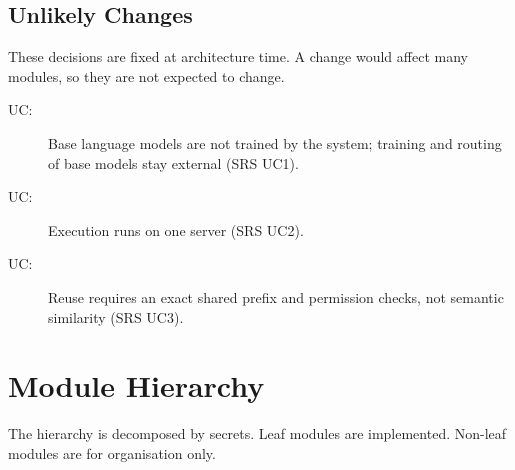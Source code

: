 \documentclass[12pt, titlepage]{article}
\newcounter{ucnum}
\newcommand{\uctheucnum}{UC\theucnum}
\begin{document}
\subsection{Unlikely Changes} \label{SecUchange}

These decisions are fixed at architecture time. A change would affect many
modules, so they are not expected to change.

\begin{description}
\item[ \uctheucnum \label{ucTraining}:] Base language
  models are not trained by the system; training and routing of base models
  stay external (SRS UC1).
\item[ \uctheucnum \label{ucSingle}:] Execution runs on
  one server (SRS UC2).
\item[ \uctheucnum \label{ucExact}:] Reuse requires an
  exact shared prefix and permission checks, not semantic similarity (SRS UC3).
\end{description}

\section{Module Hierarchy} \label{SecMH}

The hierarchy is decomposed by secrets. Leaf modules are implemented. Non-leaf
modules are for organisation only.
\end{document}
